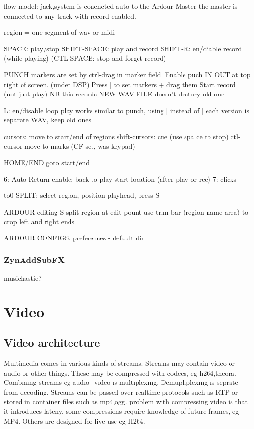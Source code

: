 \documentclass[oneside,english]{scrbook}
\begin{document}
flow model:
	jack,system is conencted auto to the Ardour Master
	the master is connected to any track with record enabled.

region = one segment of wav or midi

SPACE: 		play/stop
SHIFT-SPACE:  	play and record  
SHIFT-R:  	en/diable record (while playing)
(CTL-SPACE: 	stop and forget record)

PUNCH markers are set by ctrl-drag in marker field. 
	Enable puch IN OUT at top right of screen. (under DSP) 
	Press [ to set markers + drag them
	Start record (not just play)
	NB this records NEW WAV FILE doesn't destory old one
 
L: 	en/disable loop play
	works similar to punch, using ] instead of [
	each version is separate WAV, keep old ones	

cursors: 	move to start/end of regions
shift-cursors: 	cue (use spa  ce to stop)
ctl-cursor 	move to marks (CF set, was keypad)

HOME/END goto start/end

6: Auto-Return enable: back to play start location (after play or rec)
7: clicks

to0 SPLIT: select region, position playhead, press S


ARDOUR editing
	S split region at edit pount
	use trim bar (region name area) to crop left and right ends

ARDOUR CONFIGS:
	preferences - default dir

\section{ZynAddSubFX}

musichastie?


\part{Video}


\chapter{Video architecture}

Multimedia comes in various kinds of streams. Streams may contain
video or audio or other things. These may be compressed with codecs,
eg h264,theora. Combining streams eg audio+video is multiplexing.
Demupliplexing is seprate from decoding. Streams can be passed over
realtime protocols such as RTP or stored in container files such as
mp4,ogg. problem with compressing video is that it introduces lateny,
some compressions require knowledge of future frames, eg MP4. Others
are designed for live use eg H264. 
\end{document}
